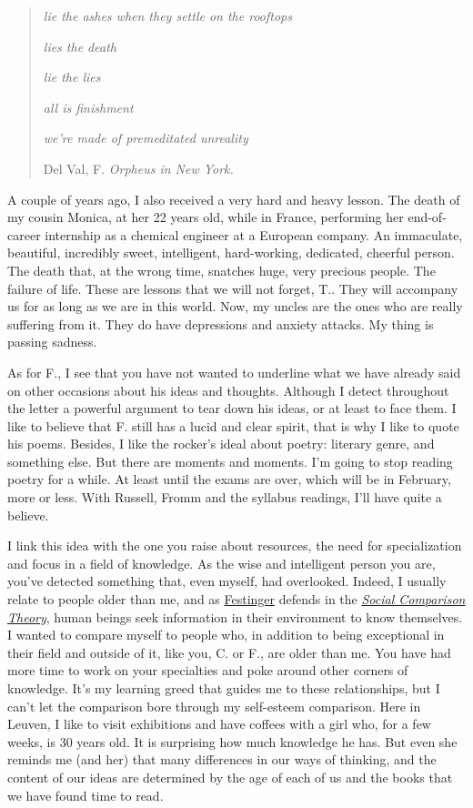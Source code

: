 \documentclass[]{book}
\begin{document}
\begin{quote}
\emph{lie the ashes when they settle on the rooftops}

\emph{lies the death}

\emph{lie the lies}

\emph{all is finishment}

\emph{we're made of premeditated unreality}

Del Val, F. \emph{Orpheus in New York.} \citep{val2011orfeo}
\end{quote}

A couple of years ago, I also received a very hard and heavy lesson. The death of my cousin Monica, at her 22 years old, while in France, performing her end-of-career internship as a chemical engineer at a European company. An immaculate, beautiful, incredibly sweet, intelligent, hard-working, dedicated, cheerful person. The death that, at the wrong time, snatches huge, very precious people. The failure of life. These are lessons that we will not forget, T.. They will accompany us for as long as we are in this world. Now, my uncles are the ones who are really suffering from it. They do have depressions and anxiety attacks. My thing is passing sadness.

As for F., I see that you have not wanted to underline what we have already said on other occasions about his ideas and thoughts. Although I detect throughout the letter a powerful argument to tear down his ideas, or at least to face them. I like to believe that F. still has a lucid and clear spirit, that is why I like to quote his poems. Besides, I like the rocker's ideal about poetry: literary genre, and something else. But there are moments and moments. I'm going to stop reading poetry for a while. At least until the exams are over, which will be in February, more or less. With Russell, Fromm and the syllabus readings, I'll have quite a believe.

I link this idea with the one you raise about resources, the need for specialization and focus in a field of knowledge. As the wise and intelligent person you are, you've detected something that, even myself, had overlooked. Indeed, I usually relate to people older than me, and as \href{https://en.wikipedia.org/wiki/Leon_Festinger}{Festinger} defends in the \href{https://en.wikipedia.org/wiki/Social_comparison_theory}{\emph{Social Comparison Theory}}, human beings seek information in their environment to know themselves. I wanted to compare myself to people who, in addition to being exceptional in their field and outside of it, like you, C. or F., are older than me. You have had more time to work on your specialties and poke around other corners of knowledge. It's my learning greed that guides me to these relationships, but I can't let the comparison bore through my self-esteem comparison. Here in Leuven, I like to visit exhibitions and have coffees with a girl who, for a few weeks, is 30 years old. It is surprising how much knowledge he has. But even she reminds me (and her) that many differences in our ways of thinking, and the content of our ideas are determined by the age of each of us and the books that we have found time to read.
\end{document}
